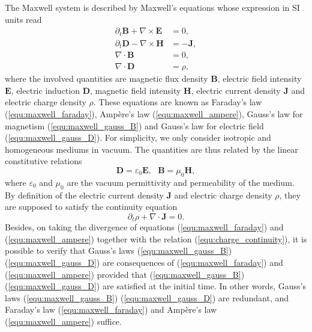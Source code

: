 \documentclass{report}
\begin{document}
The Maxwell system is described by Maxwell's equations whose expression in SI units read
\begin{align}
    \partial_t \mathbf{B} + \nabla \times \mathbf{E} &= 0, \label{equ:maxwell_faraday} \\ 
    \partial_t \mathbf{D} - \nabla \times \mathbf{H} &= -\mathbf{J}, \label{equ:maxwell_ampere} \\
    \nabla \cdot \mathbf{B} &= 0,  \label{equ:maxwell_gauss_B}\\
    \nabla \cdot \mathbf{D} &= \rho, \label{equ:maxwell_gauss_D}
\end{align}
where the involved quantities are magnetic flux density $\mathbf{B}$, electric field intensity $\mathbf{E}$, electric induction $\mathbf{D}$, magnetic field intensity $\mathbf{H}$, electric current density $\mathbf{J}$ and electric charge density $\rho$. These equations are known as Faraday's law (\ref{equ:maxwell_faraday}), Amp\`{e}re's law (\ref{equ:maxwell_ampere}), Gauss's law for magnetism (\ref{equ:maxwell_gauss_B}) and Gauss's law for electric field (\ref{equ:maxwell_gauss_D}). For simplicity, we only consider isotropic and homogeneous mediums in vacuum. The quantities are thus related by the linear constitutive relations 
\begin{equation*}
    \mathbf{D} = \varepsilon_0 \mathbf{E}, \ \ \ \mathbf{B} = \mu_0\mathbf{H}, 
\end{equation*}
where $\varepsilon_0$ and $\mu_0$ are the vacuum permittivity and permeability of the medium. By definition of the electric current density $\mathbf{J}$ and electric charge density $\rho$, they are supposed to satisfy the continuity equation
\begin{equation} \label{equ:charge_continuity}
    \partial_t\rho + \nabla \cdot \mathbf{J} = 0.
\end{equation}
Besides, on taking the divergence of equations (\ref{equ:maxwell_faraday}) and (\ref{equ:maxwell_ampere}) together with the relation (\ref{equ:charge_continuity}), it is possible to verify that Gauss's laws (\ref{equ:maxwell_gauss_B}) (\ref{equ:maxwell_gauss_D}) are consequences of (\ref{equ:maxwell_faraday}) and (\ref{equ:maxwell_ampere}) provided that (\ref{equ:maxwell_gauss_B}) (\ref{equ:maxwell_gauss_D}) are satisfied at the initial time. In other words, Gauss's laws (\ref{equ:maxwell_gauss_B}) (\ref{equ:maxwell_gauss_D}) are redundant, and Faraday's law (\ref{equ:maxwell_faraday}) and Amp\`{e}re's law (\ref{equ:maxwell_ampere}) suffice.
\end{document}
